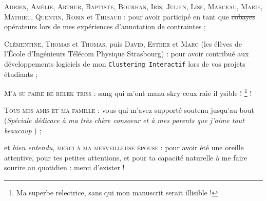 \begin{ThesisAcknowledgments}
\begin{todolist}
		\item[\itemok] \textsc{Adrien}, \textsc{Amélie}, \textsc{Arthur}, \textsc{Baptiste}, \textsc{Bourhan}, \textsc{Iris}, \textsc{Julien}, \textsc{Lise}, \textsc{Marceau}, \textsc{Marie}, \textsc{Mathieu}, \textsc{Quentin}, \textsc{Robin} et \textsc{Thibaud} : pour avoir participé en tant que \st{cobayes} opérateurs lors de mes expériences d'annotation de contraintes ; 
		\item[\itemok] \textsc{Clémentine}, \textsc{Thomas} et \textsc{Thomas}, puis \textsc{David}, \textsc{Esther} et \textsc{Marc} (les élèves de l'École d'Ingénieurs Télécom Physique Strasbourg) : pour avoir contribué aux développements logiciels de mon \texttt{Clustering Interactif} lors de vos projets étudiants ;
		\item[\itemok] \textsc{M'a su paire be relek triss} : sang qui m'ont manu skry ceux raie il ysible ! \footnote{
			Ma superbe relectrice, sans qui mon manuscrit serait illisible !
		} !
		\item[\itemok] \textsc{Tous mes amis et ma famille} : vous qui m'avez \st{supporté} soutenu jusqu'au bout (\textit{Spéciale dédicace à ma très chère consoeur et à mes parents que j'aime tout beaucoup \faGrinWink}) ;
		\item[\itemok] et \textit{bien entendu}, \textsc{merci à ma merveilleuse épouse} : pour avoir été une oreille attentive, pour tes petites attentions, et pour ta capacité naturelle à me faire sourire au quotidien : merci d'exister ! \textcolor{colorDarkPastelRed}{\faHeart}
	\end{todolist}

\end{ThesisAcknowledgments}